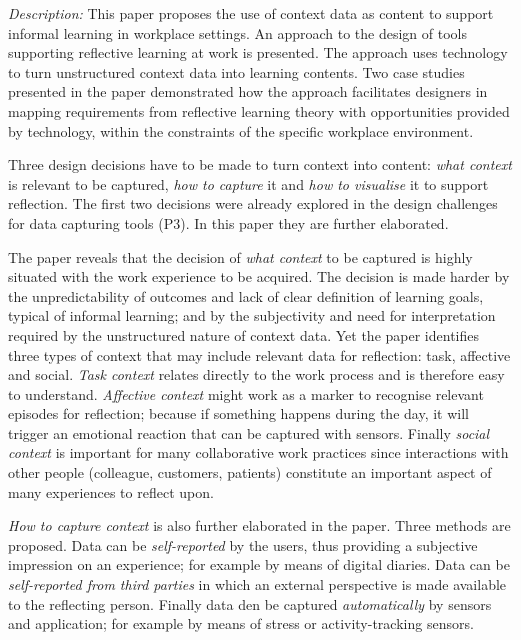 \emph{Description:}  This paper proposes the use of context data as content to support informal learning in workplace settings. An approach to the design of tools supporting reflective learning at work is presented. The approach uses technology to turn unstructured context data into learning contents. Two case studies presented in the paper demonstrated how the approach facilitates designers in mapping requirements from reflective learning theory with opportunities provided by technology, within the constraints of the specific workplace environment.

Three design decisions have to be made to turn context into content: \emph{what context} is relevant to be captured, \emph{how to capture} it and \emph{how to visualise} it to support reflection. The first two decisions were already explored in the design challenges for data capturing tools (P3). In this paper they are further elaborated.

The paper reveals that the decision of \emph{what context} to be captured is highly situated with the work experience to be acquired. The decision is made harder by the unpredictability of outcomes and lack of clear definition of learning goals, typical of informal learning; and by the subjectivity and need for interpretation required by the unstructured nature of context data. Yet the paper identifies three types of context that may include relevant data for reflection: task, affective and social. \emph{Task context} relates directly to the work process and is therefore easy to understand. \emph{Affective context} might work as a marker to recognise relevant episodes for reflection; because if something happens during the day, it will trigger an emotional reaction that can be captured with sensors. Finally \emph{social context} is important for many collaborative work practices since interactions with other people (colleague, customers, patients) constitute an important aspect of many experiences to reflect upon.

\emph{How to capture context} is also further elaborated in the paper. Three methods are proposed. Data can be \emph{self-reported} by the users, thus providing a subjective impression on an experience; for example by means of digital diaries. Data can be \emph{self-reported from third parties} in which an external perspective is made available to the reflecting person. Finally data den be captured \emph{automatically} by sensors and application; for example by means of stress or activity-tracking sensors.

